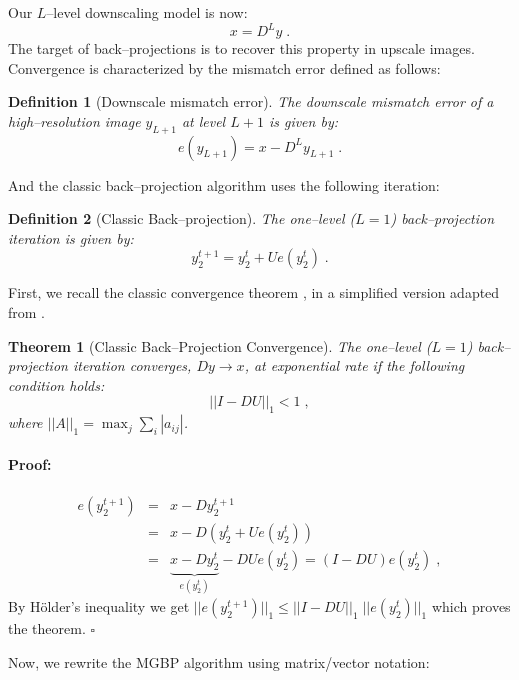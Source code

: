 \documentclass[letterpaper]{article}
\newtheorem{defn}{Definition}
\newtheorem{thm}{Theorem}
\newenvironment{proof}{\paragraph{Proof:}}{\hfill$\square$}
\begin{document}
Our $L$--level downscaling model is now:
\begin{equation}
    x = D^{L}y \;.
\end{equation}
The target of back--projections is to recover this property in upscale images. Convergence is characterized by the mismatch error defined as follows:
\begin{defn}[Downscale mismatch error]
    The \emph{downscale mismatch error} of a high--resolution image $y_{L+1}$ at level $L+1$ is given by:
    \begin{equation}
        e(y_{L+1}) = x - D^L y_{L+1} \;.
    \end{equation}
\end{defn}
And the classic back--projection algorithm uses the following iteration:
\begin{defn}[Classic Back--projection]
    The one--level ($L=1$) back--projection iteration is given by:
    \begin{equation}
        y^{t+1}_2 = y^t_2 + Ue(y^t_2) \;.
    \end{equation}
\end{defn}

First, we recall the classic convergence theorem \cite{Irani_1991a}, in a simplified version adapted from \cite{Dai_2007a}.

\begin{thm}[Classic Back--Projection Convergence] \label{thm:classic_bp}
The one--level ($L=1$) back--projection iteration converges, $Dy\rightarrow x$, at exponential rate if the following condition holds:
\begin{equation}
    ||I-DU||_1 < 1 \;,
\end{equation}
where $||A||_1=\max_j \sum_i |a_{ij}|$.
\end{thm}
\begin{proof}
    \begin{eqnarray}
        e(y^{t+1}_2) & = & x - D y^{t+1}_2 \\
        & = & x - D (y^t_2 + Ue(y^t_2)) \\
        & = & \underbrace{x - D y^t_2}_{e(y^t_2)} - DUe(y^t_2) = (I-DU) e(y^t_2) \;,
    \end{eqnarray}
    By H\"{o}lder's inequality we get $||e(y^{t+1}_2)||_1 \leqslant ||I-DU||_1 \; ||e(y^t_2)||_1$ which proves the theorem.
\end{proof}

Now, we rewrite the MGBP algorithm using matrix/vector notation:
\end{document}
